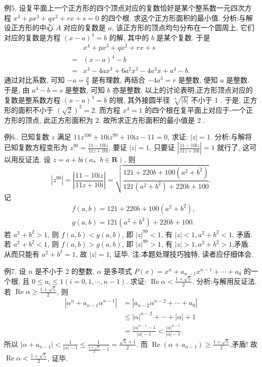 例5. 设复平面上一个正方形的四个顶点对应的复数恰好是某个整系数一元四次方程 $x^4+p x^3+q x^2+r x+s=0$ 的四个根.
求这个正方形面积的最小值.
分析:与解设正方形的中心 $A$ 对应的复数是 $a$, 该正方形的顶点均匀分布在一个圆周上, 它们对应的复数是方程 $(x-a)^4=b$ 的解, 其中的 $b$ 是某个复数.
于是
$$
\begin{aligned}
& x^4+p x^3+q x^2+r x+s \\
= & (x-a)^4-b \\
= & x^4-4 a x^3+6 a^2 x^2-4 a^3 x+a^4-b .
\end{aligned}
$$
通过对比系数, 可知 $-a=\frac{p}{4}$ 是有理数, 再结合 $-4 a^3=r$ 是整数, 便知 $a$ 是整数.
于是, 由 $a^4-b=s$ 是整数, 可知 $b$ 亦是整数.
以上的讨论表明,正方形顶点对应的复数是整系数方程 $(x-a)^4=b$ 的根, 其外接圆半径 $\sqrt[4]{|b|}$ 不小于 1 . 于是, 正方形的面积不小于 $(\sqrt{2})^2=2$. 而方程 $x^4=1$ 的四个根在复平面上对应于-一个正方形的顶点, 此正方形面积为 2. 故所求正方形面积的最小值是 2 .



例6.. 已知复数 $z$ 满足 $11 z^{100}+10 \mathrm{i} z^{99}+10 \mathrm{i} z-11=0$, 求证: $|z|=1$.
分析:与解将已知复数方程变形为 $z^{99}=\frac{11-10 \mathrm{i} z}{11 z+10 \mathrm{i}}$,
要证 $|z|=1$, 只要证 $\left|\frac{11-10 \mathrm{i} z}{11 z+10 \mathrm{i}}\right|=1$ 就行了, 这可以用反证法.
设 $z=a+b \mathrm{i}(a 、 b \in \mathbf{R})$, 则
$$
\left|z^{99}\right|=\left|\frac{11-10 \mathrm{i} z}{11 z+10 \mathrm{i}}\right|=\sqrt{\frac{121+220 b+100\left(a^2+\overline{b^2}\right)}{121\left(a^2+b^2\right)+220 b+100}} .
$$
记
$$
\begin{aligned}
& f(a, b)=121+220 b+100\left(a^2+b^2\right), \\
& g(a, b)=121\left(a^2+b^2\right)+220 b+100 .
\end{aligned}
$$
若 $a^2+b^2>1$, 则 $f(a, b)<g(a, b)$, 即 $|z|^{99}<1$, 有 $|z|<1, a^2+ b^2<1$, 矛盾.
若 $a^2+b^2<1$, 则 $f(a, b)>g(a, b)$, 即 $|z|^{99}>1$, 有 $|z|>1, a^2+ b^2>1$,矛盾.
从而只能有 $a^2+b^2=1$, 故 $|z|=1$, 证毕.
注:本题处理技巧独特, 读者应仔细体会.



例7. 设 $n$ 是不小于 2 的整数, $\alpha$ 是多项式 $P(x)=x^n+a_{n-1} x^{n-1}+\cdots+a_0$ 的一个根, 且 $0 \leqslant a_i \leqslant 1(i=0,1, \cdots, n-1)$. 求证: $\operatorname{Re} \alpha<\frac{1+\sqrt{5}}{2}$.
分析:与解用反证法.
若 $\operatorname{Re} \alpha \geqslant \frac{1+\sqrt{5}}{2}$, 则
$$
\begin{aligned}
\left|\alpha^n+a_{n-1} \alpha^{n-1}\right| & =\left|a_{n-2} \alpha^{n-2}+\cdots+a_0\right| \\
& \leqslant|\alpha|^{n-2}+\cdots+|\alpha|+1 \\
& =\frac{|\alpha|^{n-1}-1}{|\alpha|-1}<\frac{|\alpha|^{n-1}}{|\alpha|-1} .
\end{aligned}
$$
所以 $\left|\alpha+a_{n-1}\right|<\frac{1}{|\alpha|-1} \leqslant \frac{1}{\frac{1+\sqrt{5}}{2}-1}=\frac{\sqrt{5}+1}{2}$.
而 $\operatorname{Re}\left(\alpha+a_{n-1}\right) \geqslant \frac{1+\sqrt{5}}{2}$,矛盾!
故 $\operatorname{Re} \alpha<\frac{1+\sqrt{5}}{2}$, 证毕.



